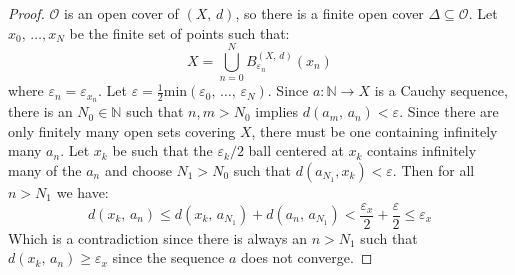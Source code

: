 \documentclass{article}
\theoremstyle{plain}
\theoremstyle{normal}
\begin{document}
\begin{proof}
            $\mathcal{O}$ is an open cover of $(X,\,d)$, so there is a finite
            open cover $\Delta\subseteq\mathcal{O}$. Let
            $x_{0},\,\dots,x_{N}$ be the finite set of points such that:
            \begin{equation}
                X=\bigcup_{n=0}^{N}B_{\varepsilon_{n}}^{(X,\,d)}(x_{n})
            \end{equation}
            where $\varepsilon_{n}=\varepsilon_{x_{n}}$. Let
            $\varepsilon=\frac{1}{2}\textrm{min}(\varepsilon_{0},\,\dots,\,\varepsilon_{N})$.
            Since $a:\mathbb{N}\rightarrow{X}$ is a Cauchy sequence, there is
            an $N_{0}\in\mathbb{N}$ such that $n,m>N_{0}$ implies
            $d(a_{m},\,a_{n})<\varepsilon$. Since there are only finitely
            many open sets covering $X$, there must be one containing
            infinitely many $a_{n}$. Let $x_{k}$ be such that the
            $\varepsilon_{k}/2$ ball centered at $x_{k}$ contains infinitely many
            of the $a_{n}$ and choose $N_{1}>N_{0}$ such that
            $d(a_{N_{1}},x_{k})<\varepsilon$. Then for all $n>N_{1}$
            we have:
            \begin{equation}
                d(x_{k},\,a_{n})\leq{d}(x_{k},\,a_{N_{1}})+d(a_{n},\,a_{N_{1}})
                    <\frac{\varepsilon_{x}}{2}+\frac{\varepsilon}{2}
                    \leq\varepsilon_{x}
            \end{equation}
            Which is a contradiction since there is always an
            $n>N_{1}$ such that
            $d(x_{k},\,a_{n})\geq\varepsilon_{x}$ since the sequence $a$ does
            not converge.
        \end{proof}
\end{document}
